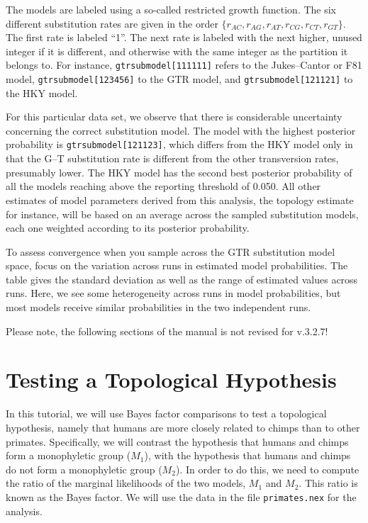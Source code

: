 \documentclass[12pt]{book}
\begin{document}
The models are labeled using a so-called restricted growth function. The six different substitution
rates are given in the order $\{r_{AC},r_{AG},r_{AT},r_{CG},r_{CT},r_{GT}\}$. The first rate is
labeled ``1''. The next rate is labeled with the next higher, unused integer if it is different,
and otherwise with the same integer as the partition it belongs to. For instance,
\texttt{gtrsubmodel[111111]} refers to the Jukes--Cantor or F81 model, \texttt{gtrsubmodel[123456]}
to the GTR model, and \texttt{gtrsubmodel[121121]} to the HKY model.

For this particular data set, we observe that there is considerable uncertainty concerning the
correct substitution model. The model with the highest posterior probability is
\texttt{gtrsubmodel[121123]}, which differs from the HKY model only in that the G--T substitution
rate is different from the other transversion rates, presumably lower. The HKY model has the second
best posterior probability of all the models reaching above the reporting threshold of 0.050. All
other estimates of model parameters derived from this analysis, the topology estimate for instance,
will be based on an average across the sampled substitution models, each one weighted according to
its posterior probability.

To assess convergence when you sample across the GTR substitution model space, focus on the
variation across runs in estimated model probabilities. The table gives the standard deviation as
well as the range of estimated values across runs. Here, we see some heterogeneity across runs in
model probabilities, but most models receive similar probabilities in the two independent runs.

\vspace{10 pt}
{\LARGE Please note, the following sections of the manual is not revised for v.3.2.7!}

\section{Testing a Topological Hypothesis}

In this tutorial, we will use Bayes factor comparisons to test a topological hypothesis, namely
that humans are more closely related to chimps than to other primates. Specifically, we will
contrast the hypothesis that humans and chimps form a monophyletic group ($M_1$), with the
hypothesis that humans and chimps do not form a monophyletic group ($M_2$).  In order to do this,
we need to compute the ratio of the marginal likelihoods of the two models, $M_1$ and $M_2$.  This
ratio is known as the Bayes factor. We will use the data in the file \texttt{primates.nex} for the
analysis.
\end{document}
